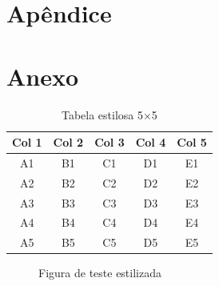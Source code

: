 \documentclass{Arquivos/TrabalhoAcademico}
\begin{document}
\inicioApendices
\chapter{Apêndice}


\inicioAnexos
\chapter{Anexo}

\begin{table}[ht]
    \centering
    \caption{Tabela estilosa 5×5}
    \label{tab:estilosa}
    \begin{tabular}{ccccc}
        \toprule
        Col 1 & Col 2 & Col 3 & Col 4 & Col 5 \\
        \midrule
        A1 & B1 & C1 & D1 & E1 \\
        A2 & B2 & C2 & D2 & E2 \\
        A3 & B3 & C3 & D3 & E3 \\
        A4 & B4 & C4 & D4 & E4 \\
        A5 & B5 & C5 & D5 & E5 \\
        \bottomrule
    \end{tabular}
\end{table}

\begin{figure}[ht]
    \centering
    \caption{Figura de teste estilizada}
    \label{fig:teste-estilosa}
\end{figure}
\end{document}
